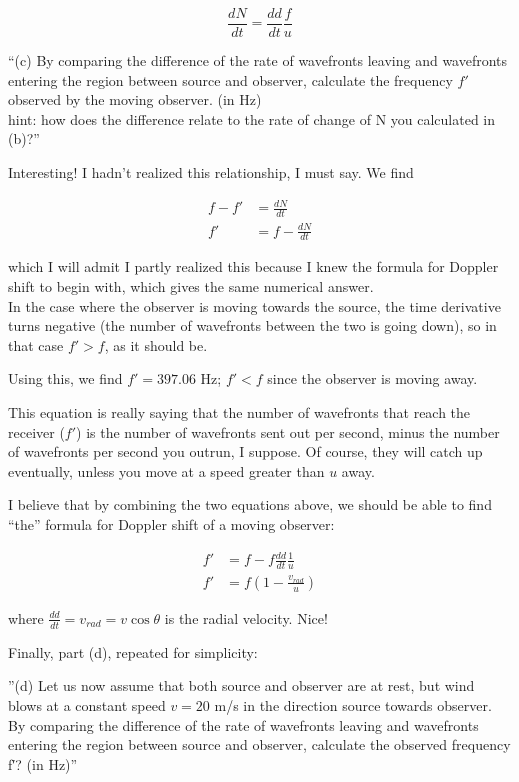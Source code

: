 \documentclass[8.01x]{subfiles}
\begin{document}
\begin{equation}
\frac{dN}{dt} = \frac{dd}{dt} \frac{f}{u}
\end{equation}

``(c) By comparing the difference of the rate of wavefronts leaving and wavefronts entering the region between source and observer, calculate the frequency $f′$ observed by the moving observer. (in Hz)\\
hint: how does the difference relate to the rate of change of N you calculated in (b)?''

Interesting! I hadn't realized this relationship, I must say. We find

\begin{align}
f - f' &= \frac{dN}{dt}\\
f' &= f - \frac{dN}{dt}
\end{align}

which I will admit I partly realized this because I knew the formula for Doppler shift to begin with, which gives the same numerical answer.\\
In the case where the observer is moving towards the source, the time derivative turns negative (the number of wavefronts between the two is going down), so in that case $f' > f$, as it should be.

Using this, we find $f' = 397.06$ Hz; $f' < f$ since the observer is moving away.

This equation is really saying that the number of wavefronts that reach the receiver ($f'$) is the number of wavefronts sent out per second, minus the number of wavefronts per second you outrun, I suppose. Of course, they will catch up eventually, unless you move at a speed greater than $u$ away.

I believe that by combining the two equations above, we should be able to find ``the'' formula for Doppler shift of a moving observer:

\begin{align}
f' &= f - f \frac{dd}{dt} \frac{1}{u}\\
f' &= f\left(1 - \frac{v_{rad}}{u}\right)
\end{align}

where $\displaystyle \frac{dd}{dt} = v_{rad} = v \cos \theta$ is the radial velocity. Nice!

Finally, part (d), repeated for simplicity:

''(d) Let us now assume that both source and observer are at rest, but wind blows at a constant speed $v = 20$ m/s in the direction source towards observer. By comparing the difference of the rate of wavefronts leaving and wavefronts entering the region between source and observer, calculate the observed frequency f′? (in Hz)''
\end{document}
